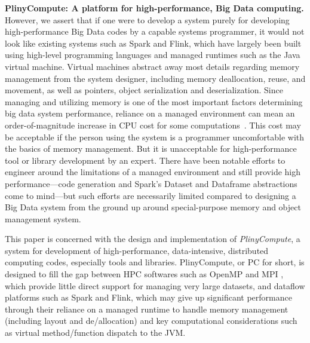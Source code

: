 \vspace{5 pt}
\noindent
\textbf{PlinyCompute: A platform for high-performance, Big Data computing.}
However, we assert that if one were to develop a system purely for developing high-performance
Big Data codes
by a capable systems programmer,
it would not look like existing systems such as Spark and Flink,
which have largely 
been built using high-level programming languages and managed runtimes such as the Java 
virtual machine.  Virtual machines abstract away
most details regarding memory management
from the system designer, including memory deallocation, reuse, and movement, as well as pointers,
object serialization and deserialization.
Since managing and utilizing memory is 
one of the most important factors determining big data system performance, reliance
on a managed environment can mean an order-of-magnitude increase in
CPU cost for some computations~\cite{blackburn2006dacapo}.  
This cost may be acceptable if the person using the system
is a programmer uncomfortable with the basics of memory management. 
But it is unacceptable for high-performance tool or library
development by an expert. There have been notable efforts to engineer around the limitations of a managed environment and still provide
high performance---code generation and Spark's Dataset and
Dataframe abstractions come to mind---but such efforts are necessarily limited compared to
designing a Big Data system from the ground up around special-purpose
memory and object management system.

This paper is concerned with the design and implementation of
\emph{PlinyCompute}, a system for development of
high-performance, data-intensive, distributed computing codes, especially tools and libraries.
PlinyCompute, or PC for short, is designed to fill the gap between
HPC softwares such as OpenMP \cite{dagum1998openmp} and MPI \cite{gropp1996high}, which provide little direct support for
managing very large datasets, and dataflow platforms such as Spark and Flink, which 
may give up significant performance through their reliance on a managed runtime to handle
memory management (including layout and de/allocation) and key computational considerations
such as virtual method/function dispatch to the JVM. 




